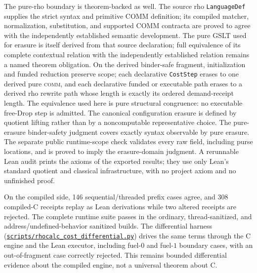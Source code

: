 \documentclass[11pt]{article}
\newcommand{\code}[1]{\texttt{#1}}
\begin{document}
The pure-rho boundary is theorem-backed as well.  The source rho
\code{LanguageDef} supplies the strict syntax and primitive COMM definition;
its compiled matcher, normalization, substitution, and supported COMM contracta
are proved to agree with the independently established semantic development.
The pure GSLT used for erasure is itself derived from that source declaration;
full equivalence of its complete contextual relation with the independently
established relation remains a named theorem obligation.  On the derived
binder-safe fragment, initialization and funded reduction preserve scope; each
declarative \code{CostStep} erases to one derived pure \textsc{comm}, and each
declarative funded or executable path erases to a derived rho rewrite path whose
length is exactly its ordered demand-receipt length.  The equivalence used here
is pure structural congruence: no executable free-Drop step is admitted.  The
canonical configuration erasure is defined by quotient lifting rather than by
a noncomputable representative choice.  The pure-erasure binder-safety judgment
covers exactly syntax observable by pure erasure.  The separate public
runtime-scope check validates every raw field, including purse locations, and is
proved to imply the erasure-domain judgment.
A rerunnable Lean audit prints the axioms of the exported results; they use only Lean's
standard quotient and classical infrastructure, with no project axiom and no unfinished
proof.

On the compiled side, 146 sequential/threaded prefix cases agree, and 308 compiled-C
receipts replay as Lean derivations while two altered receipts are rejected.  The complete
runtime suite passes in the ordinary, thread-sanitized, and address/undefined-behavior
sanitized builds.  The differential harness
(\href{https://github.com/zariuq/CeTTa/blob/e23de3043462d80e27f9c9009bd0f1b955ed140c/scripts/rhocalc_cost_differential.py}{\code{scripts/rhocalc\_cost\_differential.py}})
drives the same terms through the C engine and the Lean executor, including fuel-$0$ and
fuel-$1$ boundary cases, with an out-of-fragment case correctly rejected. This remains
bounded differential evidence about the compiled engine, not a universal theorem about C.
\end{document}
